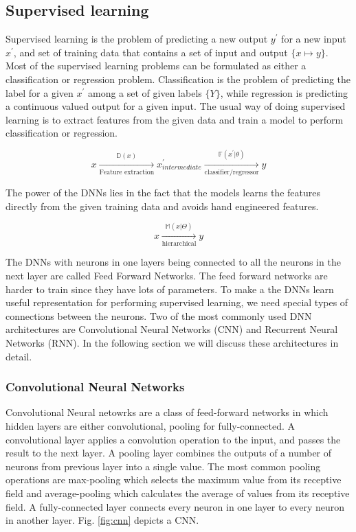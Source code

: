 \documentclass[a4paper]{article}
\begin{document}
\subsection{Supervised  learning}

Supervised  learning is the problem of predicting a new  output $y^\prime$ for a
new input $x^\prime$, and set of  training data that contains a set of input and
output  $\{x  \mapsto y\}$.  Most  of the supervised  learning problems  can  be
formulated as either a classification or  regression  problem. Classification is
the problem of predicting the label for a given $x^\prime$  among a set of given
labels $\{Y\}$, while  regression is predicting a continuous valued output for a
given input. The usual way of doing  supervised learning is to extract  features
from the given data and train a model to perform classification or regression.


\begin{equation*}
  x
  \xrightarrow[\text{Feature extraction}]{
    \mathbb{D}(x)
  }
  x^\prime
  _{intermediate}
  \xrightarrow[\text{classifier/regressor}]{
    \mathbb{F}(x^\prime | \theta)
  }
  y
\end{equation*}


The  power of  the DNNs  lies in  the  fact that  the models learns the features
directly from the given training data and avoids hand engineered features.


\begin{equation*}
  x \xrightarrow[ \text{hierarchical}] { \mathbb{M}(x | \Theta) } y
\end{equation*}


The DNNs with neurons in one  layers being  connected to all  the neurons in the
next  layer are called  Feed Forward Networks.  The  feed forward  networks  are
harder to  train since they have  lots of  parameters. To  make a the DNNs learn
useful representation for performing supervised learning, we need special  types
of  connections  between  the  neurons.  Two  of  the  most  commonly  used  DNN
architectures  are  Convolutional Neural  Networks  (CNN) and  Recurrent  Neural
Networks (RNN). In the following section we  will discuss these architectures in
detail.


\subsubsection{Convolutional Neural Networks}

Convolutional Neural netowrks  are  a class  of  feed-forward  networks in which
hidden  layers  are   either  convolutional,   pooling  for  fully-connected.  A
convolutional layer applies a convolution operation to the input, and passes the
result to  the next  layer. A pooling layer combines the outputs of  a number of
neurons from  previous  layer  into  a single value.  The  most common   pooling
operations are  max-pooling which selects the  maximum value from its  receptive
field  and  average-pooling which  calculates the  average  of values  from  its
receptive field.  A fully-connected layer  connects every neuron in one layer to
every neuron in another layer. Fig. \ref{fig:cnn} depicts a CNN.
\end{document}
